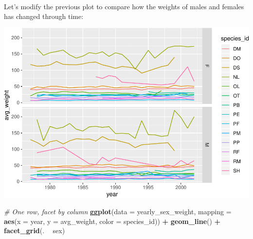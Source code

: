 \documentclass[]{book}
\newenvironment{Shaded}{\begin{snugshade}}{\end{snugshade}}
\newcommand{\KeywordTok}[1]{\textcolor[rgb]{0.13,0.29,0.53}{\textbf{#1}}}
\newcommand{\DataTypeTok}[1]{\textcolor[rgb]{0.13,0.29,0.53}{#1}}
\newcommand{\StringTok}[1]{\textcolor[rgb]{0.31,0.60,0.02}{#1}}
\newcommand{\CommentTok}[1]{\textcolor[rgb]{0.56,0.35,0.01}{\textit{#1}}}
\newcommand{\OperatorTok}[1]{\textcolor[rgb]{0.81,0.36,0.00}{\textbf{#1}}}
\newcommand{\NormalTok}[1]{#1}
\begin{document}
Let's modify the previous plot to compare how the weights of males and
females has changed through time:

\begin{Shaded}
\end{Shaded}

\includegraphics{img/R-ecology-average-weight-time-facet-sex-rows-1.pdf}

\begin{Shaded}
\begin{Highlighting}[]
\CommentTok{# One row, facet by column}
\KeywordTok{ggplot}\NormalTok{(}\DataTypeTok{data =}\NormalTok{ yearly_sex_weight, }
       \DataTypeTok{mapping =} \KeywordTok{aes}\NormalTok{(}\DataTypeTok{x =}\NormalTok{ year, }\DataTypeTok{y =}\NormalTok{ avg_weight, }\DataTypeTok{color =}\NormalTok{ species_id)) }\OperatorTok{+}
\StringTok{    }\KeywordTok{geom_line}\NormalTok{() }\OperatorTok{+}
\StringTok{    }\KeywordTok{facet_grid}\NormalTok{(. }\OperatorTok{~}\StringTok{ }\NormalTok{sex)}
\end{Highlighting}
\end{Shaded}
\end{document}
